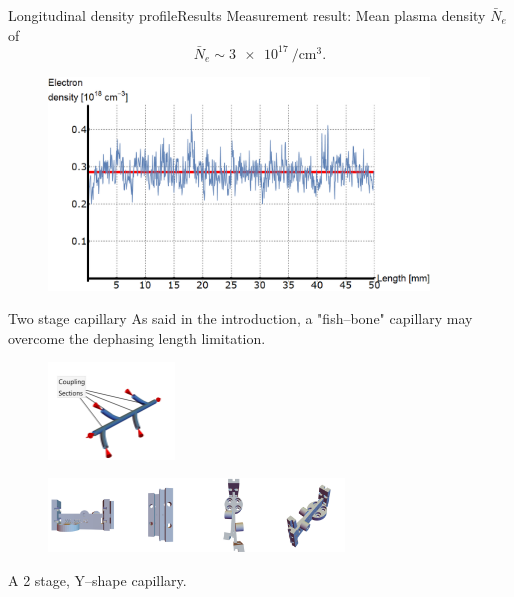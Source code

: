 \documentclass[draft]{beamer}
\begin{document}
  \begin{frame}{Longitudinal density profile}{Results}
    Measurement result: Mean plasma density $\bar{N}_e$ of
    \begin{equation*}
        \bar{N}_e \sim \SI{3e17}{\per\cubic\cm}.
    \end{equation*}
    \begin{figure}
      \includegraphics[width=0.9\textwidth]{figures/results/spectro/longitudinal_profile.png}
    \end{figure}
  \end{frame}
  \begin{frame}{Two stage capillary}
    As said in the introduction, a "fish--bone" capillary may overcome the dephasing length limitation.
     \begin{figure}
     \includegraphics[width=0.3\textwidth]{figures/coupling_scheme.pdf}
     \end{figure}
     \begin{figure}
     \includegraphics[width=0.7\textwidth]{figures/results/2stageCapillary/doublecapillary_cad.png}
     \end{figure}
     A 2 stage, Y--shape capillary.
  \end{frame}
\end{document}

